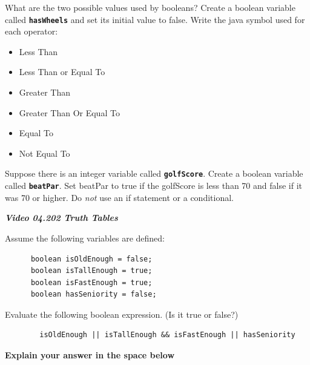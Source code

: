 \documentclass[letterpaper,11pt]{exam}
\newcommand{\videoheading}[1]{\Large\textbf{\textit{#1}}}
\begin{document}
\begin{questions}
    \question What are the two possible values used by booleans?
    \question Create a boolean variable called \texttt{\textbf{hasWheels}} and set its initial value to false.
  \question Write the java symbol used for each operator:
  \begin{itemize}
    \item Less Than
    \item Less Than or Equal To
    \item Greater Than
    \item Greater Than Or Equal To
    \item Equal To
    \item Not Equal To
  \end{itemize}
  \question Suppose there is an integer variable called \texttt{\textbf{golfScore}}.  Create a boolean variable called \texttt{\textbf{beatPar}}.  Set beatPar to true if the golfScore is less than 70 and false if it was 70 or higher.  Do \textit{not} use an if statement or a conditional.
  \vspace{1.5cm}

\videoheading{Video 04.202 Truth Tables}

\begin{samepage}
  \question Assume the following variables are defined:
  \begin{verbatim}
      boolean isOldEnough = false;
      boolean isTallEnough = true;
      boolean isFastEnough = true; 
      boolean hasSeniority = false;
  \end{verbatim}
  Evaluate the following boolean expression.  (Is it true or false?)
  \begin{verbatim}
        isOldEnough || isTallEnough && isFastEnough || hasSeniority
  \end{verbatim}
  \textbf{Explain your answer in the space below}
  \vspace{2cm}
\end{samepage}
  


\end{questions}
\end{document}
